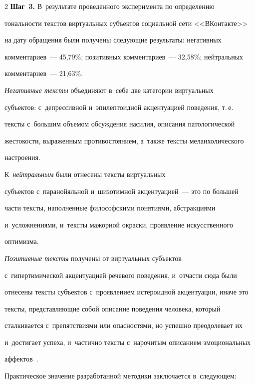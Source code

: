 \begin{multicols}{2}
  \textbf{Шаг~3.} В~результате проведенного эксперимента по определению 

тональности текстов виртуальных субъектов социальной сети <<ВКонтакте>> 

на дату обращения были получены следующие результаты: негативных 

комментариев~--- 45,79\%; позитивных комментариев~--- 32,58\%; нейтральных 

комментариев~--- 21,63\%. 

  

  

  \textit{Негативные тексты} объединяют в~себе две категории виртуальных 

субъектов: с~депрессивной и~эпилептоидной акцентуацией поведения, т.\,е.\ 

текс\-ты с~большим объемом обсуждения насилия, описания патологической 

жестокости, выраженным противостоянием, а~так\-же текс\-ты меланхолического 

настроения. 



К~\textit{нейтральным} были отнесены текс\-ты виртуальных 

субъектов с~паранойяльной и~шизотимной акцентуацией~--- это по большей 

час\-ти текс\-ты, наполненные философскими понятиями, абстракциями 

и~услож\-не\-ни\-ями, и~текс\-ты мажорной окраски, проявление искусственного 

оптимизма. 



\textit{Позитивные тексты} получены от виртуальных субъектов 

с~гипертимической акцентуацией речевого поведения, и~отчасти сюда были 

отнесены текс\-ты субъектов с~проявлением истероидной акцентуации, иначе это 

текс\-ты, представляющие собой описание поведения человека, который 

сталкивается с~препятствиями или опасностями, но успешно преодолевает их 

и~достигает успеха, и~час\-тич\-но текс\-ты с~нарочитым описанием эмоциональных 

аффектов~\cite{13-sig}.

  

  \smallskip

  

  Практическое значение разработанной методики заключается в~следующем: 


\end{multicols}

